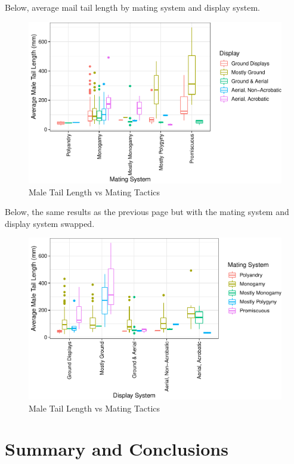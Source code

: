 \documentclass[
  12pt,
]{article}
\begin{document}
\newpage

Below, average mail tail length by mating system and display system.

\begin{figure}
\centering
\includegraphics{Project_Code_files/figure-latex/q-2-plots-1.pdf}
\caption{Male Tail Length vs Mating Tactics}
\end{figure}

\newpage

Below, the same results as the previous page but with the mating system
and display system swapped.

\begin{figure}
\centering
\includegraphics{Project_Code_files/figure-latex/q-2-plots2-1.pdf}
\caption{Male Tail Length vs Mating Tactics}
\end{figure}

\newpage

\hypertarget{summary-and-conclusions}{%
\section{Summary and Conclusions}\label{summary-and-conclusions}}
\end{document}
